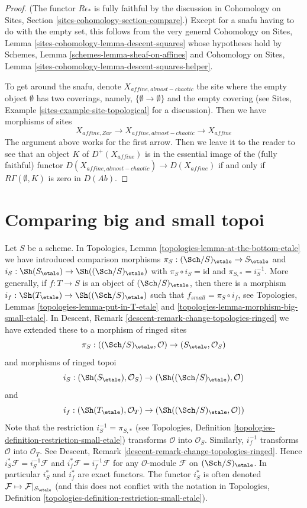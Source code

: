\begin{proof}
(The functor $R\epsilon_*$ is fully faithful by the discussion in
Cohomology on Sites, Section \ref{sites-cohomology-section-compare}.)
Except for a snafu having to do with the empty set,
this follows from the very general Cohomology on Sites, Lemma
\ref{sites-cohomology-lemma-descent-squares} whose hypotheses hold by
Schemes, Lemma \ref{schemes-lemma-sheaf-on-affines} and
Cohomology on Sites, Lemma
\ref{sites-cohomology-lemma-descent-squares-helper}.

\medskip\noindent
To get around the snafu, denote $X_{affine, almost-chaotic}$
the site where the empty object $\emptyset$ has two coverings,
namely, $\{\emptyset \to \emptyset\}$ and the empty covering
(see Sites, Example \ref{sites-example-site-topological} for a
discussion). Then we have morphisms of sites
$$
X_{affine, Zar} \to X_{affine, almost-chaotic} \to X_{affine}
$$
The argument above works for the first arrow. Then we leave it
to the reader to see that an object $K$ of $D^+(X_{affine})$
is in the essential image of the (fully faithful) functor
$D(X_{affine, almost-chaotic}) \to D(X_{affine})$ if and only
if $R\Gamma(\emptyset, K)$ is zero in $D(\textit{Ab})$.
\end{proof}

\section{Comparing big and small topoi}
\label{etale-cohomology-section-compare}
Let $S$ be a scheme. In
Topologies, Lemma \ref{topologies-lemma-at-the-bottom-etale}
we have introduced comparison morphisms
$\pi_S : (\Sch/S)_\etale \to S_\etale$ and
$i_S : \Sh(S_\etale) \to \Sh((\Sch/S)_\etale)$
with $\pi_S \circ i_S = \text{id}$ and $\pi_{S, *} = i_S^{-1}$.
More generally, if $f : T \to S$ is an object of $(\Sch/S)_\etale$,
then there is a morphism $i_f : \Sh(T_\etale) \to \Sh((\Sch/S)_\etale)$
such that $f_{small} = \pi_S \circ i_f$, see
Topologies, Lemmas \ref{topologies-lemma-put-in-T-etale} and
\ref{topologies-lemma-morphism-big-small-etale}. In
Descent, Remark \ref{descent-remark-change-topologies-ringed}
we have extended these to a morphism of ringed sites
$$
\pi_S : ((\Sch/S)_\etale, \mathcal{O}) \to (S_\etale, \mathcal{O}_S)
$$
and morphisms of ringed topoi
$$
i_S : (\Sh(S_\etale), \mathcal{O}_S) \to (\Sh((\Sch/S)_\etale), \mathcal{O})
$$
and
$$
i_f : (\Sh(T_\etale), \mathcal{O}_T) \to (\Sh((\Sch/S)_\etale, \mathcal{O}))
$$
Note that the restriction $i_S^{-1} = \pi_{S, *}$ (see
Topologies, Definition \ref{topologies-definition-restriction-small-etale})
transforms $\mathcal{O}$ into $\mathcal{O}_S$.
Similarly, $i_f^{-1}$ transforms $\mathcal{O}$ into $\mathcal{O}_T$.
See Descent, Remark \ref{descent-remark-change-topologies-ringed}.
Hence $i_S^*\mathcal{F} = i_S^{-1}\mathcal{F}$ and
$i_f^*\mathcal{F} = i_f^{-1}\mathcal{F}$ for any $\mathcal{O}$-module
$\mathcal{F}$ on $(\Sch/S)_\etale$. In particular $i_S^*$ and $i_f^*$
are exact functors. The functor $i_S^*$ is often denoted
$\mathcal{F} \mapsto \mathcal{F}|_{S_\etale}$ (and this does not
conflict with the notation in
Topologies, Definition \ref{topologies-definition-restriction-small-etale}).

